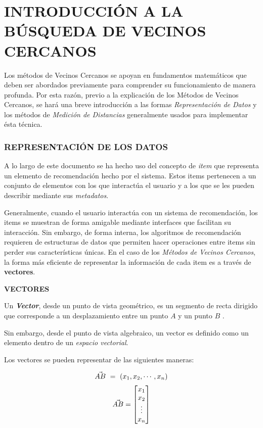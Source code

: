 \section{INTRODUCCIÓN A LA BÚSQUEDA DE VECINOS CERCANOS}
    
    Los métodos de Vecinos Cercanos se apoyan en fundamentos matemáticos que deben ser abordados previamente para comprender su funcionamiento de manera profunda. Por esta razón, previo a la explicación de los Métodos de Vecinos Cercanos, se hará una breve introducción a las formas \textit{Representación de Datos} y los métodos de \textit{Medición de Distancias} generalmente usados para implementar ésta técnica.


    \subsubsection{REPRESENTACIÓN DE LOS DATOS}

    A lo largo de este documento se ha hecho uso del concepto de \textit{item} que representa un elemento de recomendación hecho por el sistema.
    Estos items pertenecen a un conjunto de elementos con los que interactúa el usuario y a los que se les pueden describir mediante sus \textit{metadatos}.

    Generalmente, cuando el usuario interactúa con un sistema de recomendación, los items se muestran de forma amigable mediante interfaces que facilitan su interacción. Sin embargo, de forma interna, los algoritmos de recomendación requieren de estructuras de datos que permiten hacer operaciones entre items sin perder sus características únicas. 
    En el caso de los \textit{Métodos de Vecinos Cercanos}, la forma más eficiente de representar la información de cada item es a través de \textbf{vectores}.

    \textbf{VECTORES}

    Un \textit{\textbf{Vector}}, desde un punto de vista geométrico, es un segmento de recta dirigido que corresponde a un desplazamiento entre un punto $A$ y un punto $B$ \parencite{poole2007álgebra}.
    
    Sin embargo, desde el punto de vista algebraico, un vector es definido como un elemento dentro de un \textit{espacio vectorial}.
    
    Los vectores se pueden representar de las siguientes maneras: 

    \begin{equation}
        \addequation{Definición de un Vector (Tupla)}
        \label{vectorTupla}
        \vec{AB} \ = \ (x_1, x_2, \cdots, x_n)
    \end{equation}
    \begin{equation}
        \vec{AB} = 
        \begin{bmatrix}
            x_1
            \\
            x_2
            \\
            \vdots
            \\
            x_n
        \end{bmatrix}
        \addequation{Definición de un Vector (Matriz)}
        \label{vectorMatriz}
    \end{equation}

